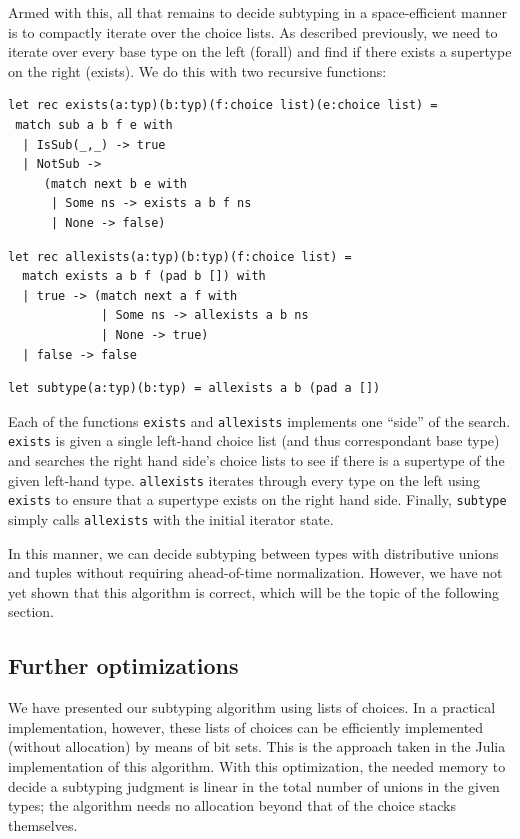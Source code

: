 \documentclass[a4paper,english]{lipics-v2019}
\begin{document}
Armed with this, all that remains to decide subtyping in a space-efficient
manner is to compactly iterate over the choice lists. As described previously,
we need to iterate over every base type on the left (forall) and find if there
exists a supertype on the right (exists). We do this with two recursive
functions:


\begin{lstlisting}
let rec exists(a:typ)(b:typ)(f:choice list)(e:choice list) =
 match sub a b f e with 
  | IsSub(_,_) -> true 
  | NotSub -> 
     (match next b e with
      | Some ns -> exists a b f ns 
      | None -> false) 
\end{lstlisting}

 \begin{lstlisting}
let rec allexists(a:typ)(b:typ)(f:choice list) =
  match exists a b f (pad b []) with 
  | true -> (match next a f with
             | Some ns -> allexists a b ns 
             | None -> true) 
  | false -> false
\end{lstlisting}


\begin{lstlisting}
let subtype(a:typ)(b:typ) = allexists a b (pad a [])
\end{lstlisting}

Each of the functions \lstinline{exists} and \lstinline{allexists}
implements one ``side'' of the search. \lstinline{exists} is given a single
left-hand choice list (and thus correspondant base type) and searches the
right hand side's choice lists to see if there is a supertype of the given
left-hand type. \lstinline{allexists} iterates through every type on the
left using \lstinline{exists} to ensure that a supertype exists on the right
hand side. Finally, \lstinline{subtype} simply calls \lstinline{allexists}
with the initial iterator state.

In this manner, we can decide subtyping between types with distributive unions and tuples
without requiring ahead-of-time normalization. However, we have not yet shown that this
algorithm is correct, which will be the topic of the following section.

\subsection{Further optimizations}

We have presented our subtyping algorithm using lists of choices. In a
practical implementation, however, these lists of choices can be efficiently
implemented (without allocation) by means of bit sets. This is the approach
taken in the Julia implementation of this algorithm. With this optimization,
the needed memory to decide a subtyping judgment is linear in the total number
of unions in the given types; the algorithm needs no allocation beyond that
of the choice stacks themselves.
\end{document}
